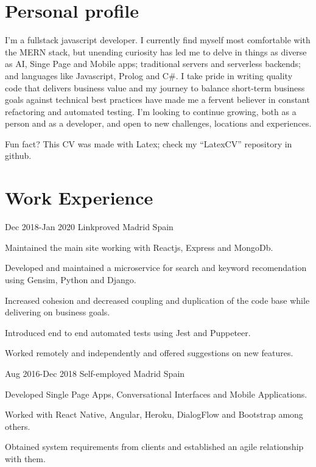 \documentclass[10pt]{CurriculumVitae}
\begin{document}
  \makeheading


  \section{Personal profile}
    {
      I'm a fullstack javascript developer.
      I currently find myself most comfortable with the MERN stack,
      but unending curiosity has led me to delve in things as diverse as
      AI, Singe Page and Mobile apps;
      traditional servers and serverless backends;
      and languages like Javascript, Prolog and C\#.
      I take pride in writing quality code that delivers business value
      and my journey to balance short-term business goals against technical best practices
      have made me a fervent believer in constant refactoring and automated testing.
      I'm looking to continue growing, both as a person and as a developer,
      and open to new challenges, locations and experiences.
      
      \null\hfill {\scriptsize Fun fact? This CV was made with Latex; check my ``LatexCV'' repository in github.}
    }


  \section{Work Experience}
      {Dec 2018-Jan 2020}
      {Linkproved}
      {Madrid}
      {Spain}
      {
        \item Maintained the main site working with Reactjs, Express and MongoDb.
        \item Developed and maintained a microservice for search and keyword recomendation using Gensim, Python and Django.
        \item Increased cohesion and decreased coupling and duplication of the code base while delivering on business goals.
        \item Introduced end to end automated tests using Jest and Puppeteer.
        \item Worked remotely and independently and offered suggestions on new features.
      }

      {Aug 2016-Dec 2018}
      {Self-employed}
      {Madrid}
      {Spain}
      {
        \item Developed Single Page Apps, Conversational Interfaces and Mobile Applications.
        \item Worked with React Native, Angular, Heroku, DialogFlow and Bootstrap among others.
        \item Obtained system requirements from clients and established an agile relationship with them.
      }
   
\end{document}
